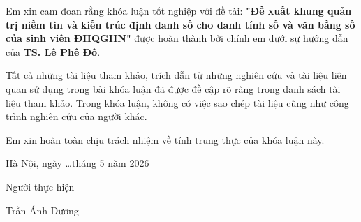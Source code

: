 
Em xin cam đoan rằng khóa luận tốt nghiệp với đề tài: \textbf{"Đề xuất khung quản trị niềm tin và kiến trúc định danh số cho danh tính số và văn bằng số của sinh viên ĐHQGHN"} được hoàn thành bởi chính em dưới sự hướng dẫn của \textbf{TS. Lê Phê Đô}. 

Tất cả những tài liệu tham khảo, trích dẫn từ những nghiên cứu và tài liệu liên quan sử dụng trong bài khóa luận đã được đề cập rõ ràng trong danh sách tài liệu tham khảo. Trong khóa luận, không có việc sao chép tài liệu cũng như công trình nghiên cứu của người khác.

Em xin hoàn toàn chịu trách nhiệm về tính trung thực của khóa luận này.

\vspace{1cm}

\begin{flushright}
\begin{minipage}{0.4\textwidth}
    \centering
    Hà Nội, ngày \ldots tháng 5 năm 2026
    \vspace{0.5cm}
    
    Người thực hiện
    \vspace{2cm}
    
    Trần Ánh Dương
\end{minipage}
\end{flushright}